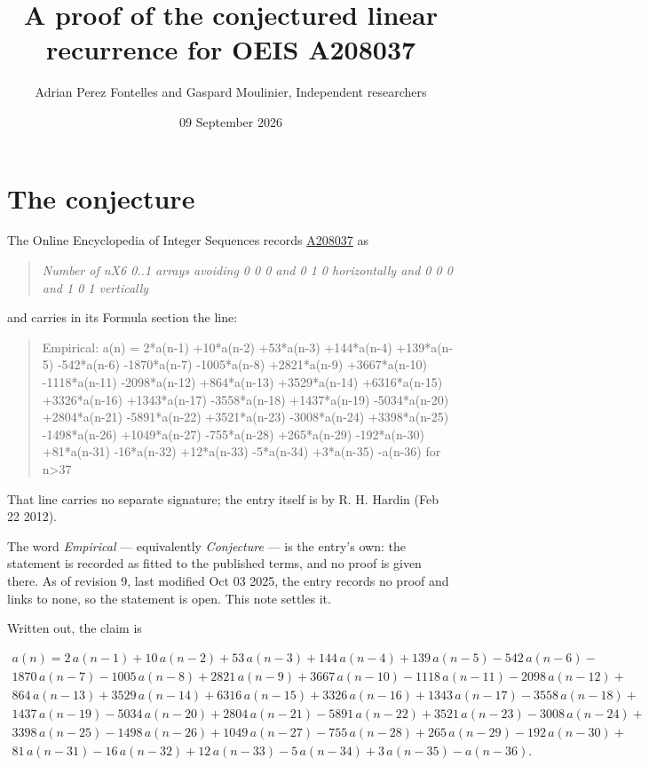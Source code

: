 \documentclass[11pt]{article}
\title{A proof of the conjectured linear recurrence for OEIS A208037}
\author{Adrian Perez Fontelles and Gaspard Moulinier, Independent researchers}
\date{09 September 2026}
\theoremstyle{definition}
\begin{document}
\maketitle
\section{The conjecture}

The Online Encyclopedia of Integer Sequences records \href{https://oeis.org/A208037}{A208037} as

\begin{quote}\itshape Number of nX6 0..1 arrays avoiding 0 0 0 and 0 1 0 horizontally and 0 0 0 and 1 0 1 vertically\end{quote}

and carries in its Formula section the line:

\begin{quote}\ttfamily Empirical: a(n) = 2*a(n-1) +10*a(n-2) +53*a(n-3) +144*a(n-4) +139*a(n-5) -542*a(n-6) -1870*a(n-7) -1005*a(n-8) +2821*a(n-9) +3667*a(n-10) -1118*a(n-11) -2098*a(n-12) +864*a(n-13) +3529*a(n-14) +6316*a(n-15) +3326*a(n-16) +1343*a(n-17) -3558*a(n-18) +1437*a(n-19) -5034*a(n-20) +2804*a(n-21) -5891*a(n-22) +3521*a(n-23) -3008*a(n-24) +3398*a(n-25) -1498*a(n-26) +1049*a(n-27) -755*a(n-28) +265*a(n-29) -192*a(n-30) +81*a(n-31) -16*a(n-32) +12*a(n-33) -5*a(n-34) +3*a(n-35) -a(n-36) for n>37\end{quote}

That line carries no separate signature; the entry itself is by R. H. Hardin (Feb 22 2012).

The word {\itshape Empirical} --- equivalently {\itshape Conjecture} --- is the entry's own: the statement is recorded as fitted to the published terms, and no proof is given there. As of revision 9, last modified Oct 03 2025, the entry records no proof and links to none, so the statement is open. This note settles it.

Written out, the claim is

\begin{multline*} a(n) = 2\,a(n-1) + 10\,a(n-2) + 53\,a(n-3) + 144\,a(n-4) + 139\,a(n-5) - 542\,a(n-6) - \\ 1870\,a(n-7) - 1005\,a(n-8) + 2821\,a(n-9) + 3667\,a(n-10) - 1118\,a(n-11) - 2098\,a(n-12) + \\ 864\,a(n-13) + 3529\,a(n-14) + 6316\,a(n-15) + 3326\,a(n-16) + 1343\,a(n-17) - 3558\,a(n-18) + \\ 1437\,a(n-19) - 5034\,a(n-20) + 2804\,a(n-21) - 5891\,a(n-22) + 3521\,a(n-23) - 3008\,a(n-24) + \\ 3398\,a(n-25) - 1498\,a(n-26) + 1049\,a(n-27) - 755\,a(n-28) + 265\,a(n-29) - 192\,a(n-30) + \\ 81\,a(n-31) - 16\,a(n-32) + 12\,a(n-33) - 5\,a(n-34) + 3\,a(n-35) - a(n-36). \end{multline*}
\end{document}
